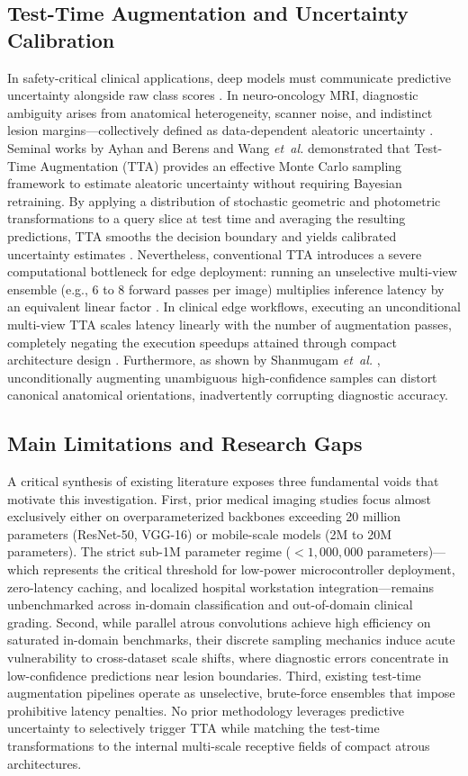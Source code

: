 \subsection{Test-Time Augmentation and Uncertainty Calibration}
In safety-critical clinical applications, deep models must communicate predictive uncertainty alongside raw class scores \cite{10, 57}. In neuro-oncology MRI, diagnostic ambiguity arises from anatomical heterogeneity, scanner noise, and indistinct lesion margins---collectively defined as data-dependent aleatoric uncertainty \cite{4, 47}. Seminal works by Ayhan and Berens \cite{4} and Wang \emph{et~al.} \cite{47} demonstrated that Test-Time Augmentation (TTA) provides an effective Monte Carlo sampling framework to estimate aleatoric uncertainty without requiring Bayesian retraining. By applying a distribution of stochastic geometric and photometric transformations to a query slice at test time and averaging the resulting predictions, TTA smooths the decision boundary and yields calibrated uncertainty estimates \cite{4, 47, 58}. Nevertheless, conventional TTA introduces a severe computational bottleneck for edge deployment: running an unselective multi-view ensemble (e.g., 6 to 8 forward passes per image) multiplies inference latency by an equivalent linear factor \cite{58}. In clinical edge workflows, executing an unconditional multi-view TTA scales latency linearly with the number of augmentation passes, completely negating the execution speedups attained through compact architecture design \cite{47, 58}. Furthermore, as shown by Shanmugam \emph{et~al.} \cite{58}, unconditionally augmenting unambiguous high-confidence samples can distort canonical anatomical orientations, inadvertently corrupting diagnostic accuracy.

\subsection{Main Limitations and Research Gaps}
A critical synthesis of existing literature exposes three fundamental voids that motivate this investigation. First, prior medical imaging studies focus almost exclusively either on overparameterized backbones exceeding 20 million parameters (ResNet-50, VGG-16) or mobile-scale models (2M to 20M parameters). The strict sub-1M parameter regime ($<1,000,000$ parameters)---which represents the critical threshold for low-power microcontroller deployment, zero-latency caching, and localized hospital workstation integration---remains unbenchmarked across in-domain classification and out-of-domain clinical grading. Second, while parallel atrous convolutions achieve high efficiency on saturated in-domain benchmarks, their discrete sampling mechanics induce acute vulnerability to cross-dataset scale shifts, where diagnostic errors concentrate in low-confidence predictions near lesion boundaries. Third, existing test-time augmentation pipelines operate as unselective, brute-force ensembles that impose prohibitive latency penalties. No prior methodology leverages predictive uncertainty to selectively trigger TTA while matching the test-time transformations to the internal multi-scale receptive fields of compact atrous architectures.

